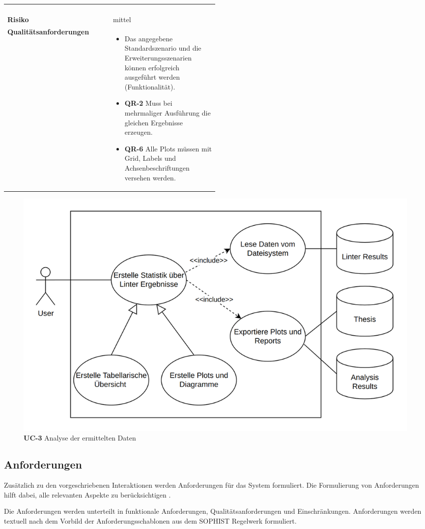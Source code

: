 \begin{longtable}{lp{0.5\linewidth}}
\begin{enumerate}
  \end{enumerate}
  \\
  \textbf{Risiko} & \hspace{0.8cm} mittel \\
  \textbf{Qualitätsanforderungen} & 
  \vspace{-0.7cm}
  \begin{itemize}
    \item Das angegebene Standardszenario und die Erweiterungsszenarien können erfolgreich ausgeführt werden (Funktionalität).
    \item \textbf{QR-2} Muss bei mehrmaliger Ausführung die gleichen Ergebnisse erzeugen.
    \item \textbf{QR-6} Alle Plots müssen mit Grid, Labels und Achsenbeschriftungen versehen werden.
  \end{itemize}
   \\ \hline\hline
\end{longtable}
\begin{figure}[htbp]
  \centering
  \includegraphics[width=1\linewidth]{img/describe.png}
  \caption{\textbf{UC-3} Analyse der ermittelten Daten}
  \label{fig:UC3}
\end{figure}


\subsection{Anforderungen} \label{sec:anforderungen}
Zusätzlich zu den vorgeschriebenen Interaktionen werden Anforderungen für das System formuliert. Die Formulierung von Anforderungen hilft dabei, alle relevanten Aspekte zu berücksichtigen \parencite{bergsmann_requirements_2023}.

Die Anforderungen werden unterteilt in funktionale Anforderungen, Qualitätsanforderungen und Einschränkungen. Anforderungen werden textuell nach dem Vorbild der Anforderungsschablonen aus dem SOPHIST Regelwerk \parencite{rupp_requirements-engineering_2014} formuliert.


